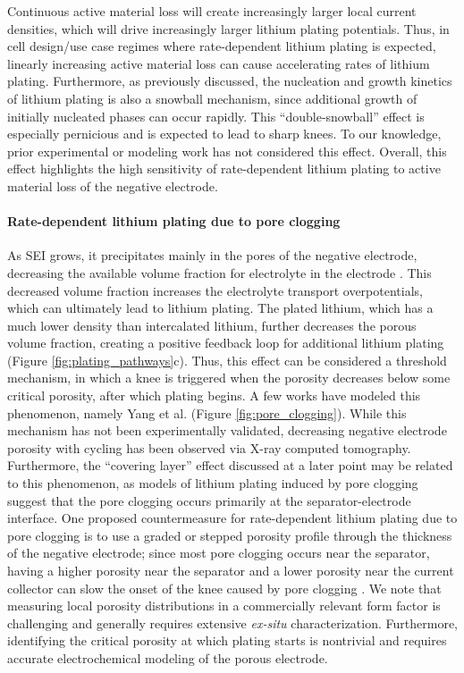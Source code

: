 \documentclass[journal=jpclcd,manuscript=article]{achemso}
\begin{document}
Continuous active material loss will create increasingly larger local current densities, which will drive increasingly larger lithium plating potentials. Thus, in cell design/use case regimes where rate-dependent lithium plating is expected, linearly increasing active material loss can cause accelerating rates of lithium plating. Furthermore, as previously discussed, the nucleation and growth kinetics of lithium plating is also a snowball mechanism, since additional growth of initially nucleated phases can occur rapidly. This ``double-snowball'' effect is especially pernicious and is expected to lead to sharp knees. To our knowledge, prior experimental or modeling work has not considered this effect. Overall, this effect highlights the high sensitivity of rate-dependent lithium plating to active material loss of the negative electrode.

\paragraph{Rate-dependent lithium plating due to pore clogging}
As SEI grows, it precipitates mainly in the pores of the negative electrode, decreasing the available volume fraction for electrolyte in the electrode \cite{sikha_effect_2004}. This decreased volume fraction increases the electrolyte transport overpotentials, which can ultimately lead to lithium plating. The plated lithium, which has a much lower density than intercalated lithium\cite{yang_modeling_2017}, further decreases the porous volume fraction, creating a positive feedback loop for additional lithium plating\cite{yang_modeling_2017} (Figure \ref{fig:plating_pathways}c).
Thus, this effect can be considered a threshold mechanism, in which a knee is triggered when the porosity decreases below some critical porosity, after which plating begins.
A few works have modeled this phenomenon\cite{yang_modeling_2017, muller_model-based_2019, keil_electrochemical_2020}, namely Yang et al.\cite{yang_modeling_2017} (Figure \ref{fig:pore_clogging}).
While this mechanism has not been experimentally validated, decreasing negative electrode porosity with cycling has been observed via X-ray computed tomography.\cite{frisco_understanding_2016, rahe_nanoscale_2019} Furthermore, the ``covering layer'' effect discussed at a later point may be related to this phenomenon, as models of lithium plating induced by pore clogging suggest that the pore clogging occurs primarily at the separator-electrode interface.\cite{yang_modeling_2017}
One proposed countermeasure for rate-dependent lithium plating due to pore clogging is to use a graded or stepped porosity profile through the thickness of the negative electrode; since most pore clogging occurs near the separator, having a higher porosity near the separator and a lower porosity near the current collector can slow the onset of the knee caused by pore clogging \cite{muller_model-based_2019}.
We note that measuring local porosity distributions in a commercially relevant form factor is challenging and generally requires extensive \textit{ex-situ} characterization. Furthermore, identifying the critical porosity at which plating starts is nontrivial and requires accurate electrochemical modeling of the porous electrode.
\end{document}
